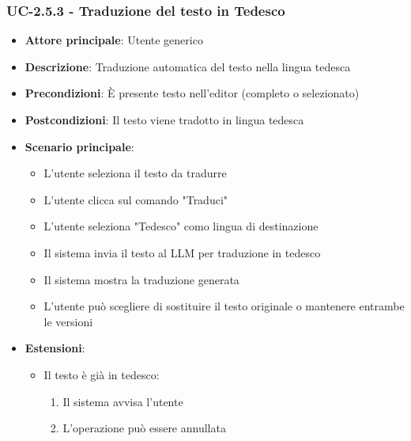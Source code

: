 \documentclass[11pt,a4paper]{article}
\begin{document}
\subsubsection{UC-2.5.3 - Traduzione del testo in Tedesco}
\begin{itemize}
    \item \textbf{Attore principale}: Utente generico
    \item \textbf{Descrizione}: Traduzione automatica del testo nella lingua tedesca
    \item \textbf{Precondizioni}: È presente testo nell'editor (completo o selezionato)
    \item \textbf{Postcondizioni}: Il testo viene tradotto in lingua tedesca
    \item \textbf{Scenario principale}:
        \begin{itemize}
            \item L'utente seleziona il testo da tradurre
            \item L'utente clicca sul comando "Traduci"
            \item L'utente seleziona "Tedesco" como lingua di destinazione
            \item Il sistema invia il testo al LLM per traduzione in tedesco
            \item Il sistema mostra la traduzione generata
            \item L'utente può scegliere di sostituire il testo originale o mantenere entrambe le versioni
        \end{itemize}
    \item \textbf{Estensioni}:
        \begin{itemize}
            \item Il testo è già in tedesco:
                \begin{enumerate}
                    \item Il sistema avvisa l'utente
                    \item L'operazione può essere annullata
                \end{enumerate}
        \end{itemize}
\end{itemize}
\end{document}
